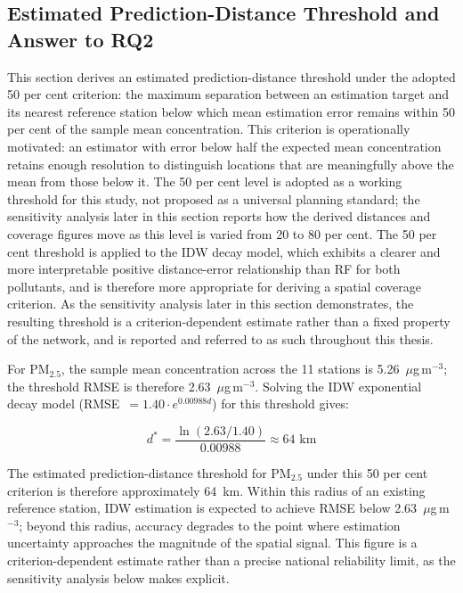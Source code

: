 \documentclass[11pt,a4paper]{article}
\let\oldsubsection\subsection
\renewcommand{\subsection}{\FloatBarrier\oldsubsection}
\begin{document}
\subsection{Estimated Prediction-Distance Threshold and Answer to RQ2}
\label{sec:decay-threshold}

This section derives an estimated prediction-distance threshold under the adopted 50 per cent criterion: the maximum separation between an estimation target and its nearest reference station below which mean estimation error remains within 50 per cent of the sample mean concentration. This criterion is operationally motivated: an estimator with error below half the expected mean concentration retains enough resolution to distinguish locations that are meaningfully above the mean from those below it. The 50 per cent level is adopted as a working threshold for this study, not proposed as a universal planning standard; the sensitivity analysis later in this section reports how the derived distances and coverage figures move as this level is varied from 20 to 80 per cent. The 50 per cent threshold is applied to the IDW decay model, which exhibits a clearer and more interpretable positive distance-error relationship than RF for both pollutants, and is therefore more appropriate for deriving a spatial coverage criterion. As the sensitivity analysis later in this section demonstrates, the resulting threshold is a criterion-dependent estimate rather than a fixed property of the network, and is reported and referred to as such throughout this thesis.

For PM$_{2.5}$, the sample mean concentration across the 11 stations is 5.26~$\mu$g\,m$^{-3}$; the threshold RMSE is therefore 2.63~$\mu$g\,m$^{-3}$. Solving the IDW exponential decay model (\mbox{RMSE~$= 1.40 \cdot e^{0.00988d}$}) for this threshold gives:

\begin{equation}
d^* = \frac{\ln(2.63 / 1.40)}{0.00988} \approx 64 \text{ km}
\label{eq:pm25-threshold}
\end{equation}

The estimated prediction-distance threshold for PM$_{2.5}$ under this 50 per cent criterion is therefore approximately 64~km. Within this radius of an existing reference station, IDW estimation is expected to achieve RMSE below 2.63~$\mu$g\,m$^{-3}$; beyond this radius, accuracy degrades to the point where estimation uncertainty approaches the magnitude of the spatial signal. This figure is a criterion-dependent estimate rather than a precise national reliability limit, as the sensitivity analysis below makes explicit.
\end{document}
